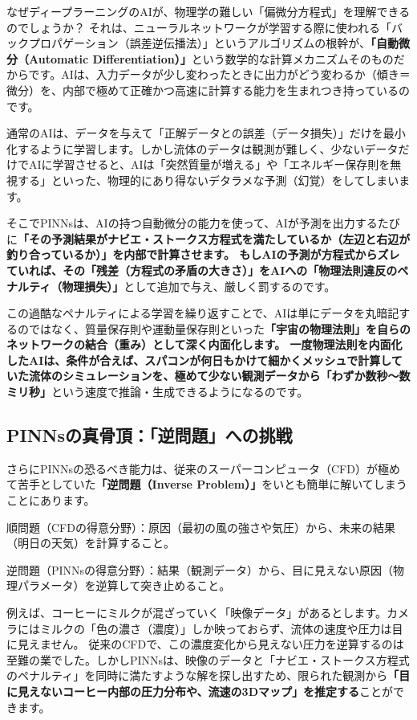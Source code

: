 なぜディープラーニングのAIが、物理学の難しい「偏微分方程式」を理解できるのでしょうか？ それは、ニューラルネットワークが学習する際に使われる「バックプロパゲーション（誤差逆伝播法）」というアルゴリズムの根幹が、\textbf{「自動微分（Automatic Differentiation）」}という数学的な計算メカニズムそのものだからです。AIは、入力データが少し変わったときに出力がどう変わるか（傾き＝微分）を、内部で極めて正確かつ高速に計算する能力を生まれつき持っているのです。

通常のAIは、データを与えて「正解データとの誤差（データ損失）」だけを最小化するように学習します。しかし流体のデータは観測が難しく、少ないデータだけでAIに学習させると、AIは「突然質量が増える」や「エネルギー保存則を無視する」といった、物理的にあり得ないデタラメな予測（幻覚）をしてしまいます。

そこでPINNsは、AIの持つ自動微分の能力を使って、AIが予測を出力するたびに\textbf{「その予測結果がナビエ・ストークス方程式を満たしているか（左辺と右辺が釣り合っているか）」を内部で計算させます。 もしAIの予測が方程式からズレていれば、その「残差（方程式の矛盾の大きさ）」をAIへの「物理法則違反のペナルティ（物理損失）」}として追加で与え、厳しく罰するのです。

この過酷なペナルティによる学習を繰り返すことで、AIは単にデータを丸暗記するのではなく、質量保存則や運動量保存則といった\textbf{「宇宙の物理法則」を自らのネットワークの結合（重み）として深く内面化します。 一度物理法則を内面化したAIは、条件が合えば、スパコンが何日もかけて細かくメッシュで計算していた流体のシミュレーションを、極めて少ない観測データから「わずか数秒〜数ミリ秒」}という速度で推論・生成できるようになるのです。

\subsection{PINNsの真骨頂：「逆問題」への挑戦}

さらにPINNsの恐るべき能力は、従来のスーパーコンピュータ（CFD）が極めて苦手としていた\textbf{「逆問題（Inverse Problem）」}をいとも簡単に解いてしまうことにあります。

順問題（CFDの得意分野）：原因（最初の風の強さや気圧）から、未来の結果（明日の天気）を計算すること。

逆問題（PINNsの得意分野）：結果（観測データ）から、目に見えない原因（物理パラメータ）を逆算して突き止めること。

例えば、コーヒーにミルクが混ざっていく「映像データ」があるとします。カメラにはミルクの「色の濃さ（濃度）」しか映っておらず、流体の速度や圧力は目に見えません。 従来のCFDで、この濃度変化から見えない圧力を逆算するのは至難の業でした。しかしPINNsは、映像のデータと「ナビエ・ストークス方程式のペナルティ」を同時に満たすような解を探し出すため、限られた観測から\textbf{「目に見えないコーヒー内部の圧力分布や、流速の3Dマップ」を推定する}ことができます。

